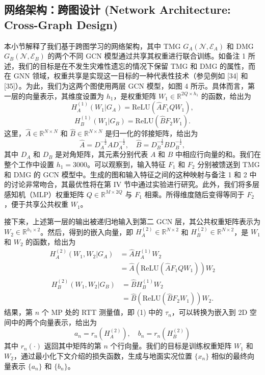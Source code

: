 \documentclass[journal]{IEEEtran}
\begin{document}
\subsection{网络架构：跨图设计 (Network Architecture: Cross-Graph Design)}
本小节解释了我们基于跨图学习的网络架构，其中 TMG $G_{A}(\mathcal{N},\mathcal{E}_{A})$ 和 DMG $G_{B}(\mathcal{N},\mathcal{E}_{B})$ 的两个不同 GCN 模型通过共享其权重进行联合训练。如备注 1 所述，我们的目标是在不发生灾难性遗忘的情况下保留 TMG 和 DMG 的属性，而在 GNN 领域，权重共享是实现这一目标的一种代表性技术（参见例如 [34] 和 [35]）。为此，我们为这两个图使用两层 GCN 模型，如图 4 所示。具体而言，第一层的向量表示，其维度设置为 $h_{1}$，是权重矩阵 $W_{1}\in\mathbb{R}^{2Q\times h_{1}}$ 的函数，给出为
\begin{equation}
H_{A}^{(1)}(W_{1}|G_{A})=\text{ReLU}(\hat{A}F_{1}QW_{1}), \label{eq:16}
\end{equation}
\begin{equation}
H_{B}^{(1)}(W_{1}|G_{B})=\text{ReLU}(\hat{B}F_{2}W_{1}). \label{eq:17}
\end{equation}
这里，$\hat{A}\in\mathbb{R}^{N\times N}$ 和 $\hat{B}\in\mathbb{R}^{N\times N}$ 是归一化的邻接矩阵，给出为
\begin{equation}
\hat{A}=D_{A}^{-\frac{1}{2}}AD_{A}^{-\frac{1}{2}}, \quad \hat{B}=D_{B}^{-\frac{1}{2}}BD_{B}^{-\frac{1}{2}}, \label{eq:18}
\end{equation}
其中 $D_{A}$ 和 $D_{B}$ 是对角矩阵，其元素分别代表 $A$ 和 $B$ 中相应行向量的和。我们在整个工作中设置 $h_{1}=3000$。可以观察到，输入特征 $F_{1}$ 和 $F_{2}$ 分别被馈送到 TMG 和 DMG 的 GCN 模型中。生成的图和输入特征之间的这种映射与备注 1 和 2 中的讨论非常吻合，其最优性将在第 IV 节中通过实验进行研究。此外，我们将多层感知机（MLP）权重矩阵 $Q\in\mathbb{R}^{M\times2Q}$ 与 $F_{1}$ 相乘。所得维度随后变得等同于 $F_{2}$，便于共享公共权重 $W_{1}$。

接下来，上述第一层的输出被递归地输入到第二 GCN 层，其公共权重矩阵表示为 $W_{2}\in\mathbb{R}^{h_{1}\times2}$。然后，得到的嵌入向量，即 $H_{A}^{(2)}\in\mathbb{R}^{N\times2}$ 和 $H_{B}^{(2)}\in\mathbb{R}^{N\times2}$，是 $W_{1}$ 和 $W_{2}$ 的函数，给出为
\begin{align}
H_{A}^{(2)}(W_{1},W_{2}|G_{A}) &= \hat{A}H_{A}^{(1)}W_{2} \nonumber \\
&= \hat{A}(\text{ReLU}(\hat{A}F_{1}QW_{1}))W_{2} \label{eq:19}
\end{align}
\begin{align}
H_{B}^{(2)}(W_{1},W_{2}|G_{B}) &= \hat{B}H_{B}^{(1)}W_{2} \nonumber \\
&= \hat{B}(\text{ReLU}(\hat{B}F_{2}W_{1}))W_{2}. \label{eq:20}
\end{align}
结果，第 $n$ 个 MP 处的 RTT 测量值，即 (1) 中的 $\tau_{n}$，可以转换为嵌入到 2D 空间中的两个向量表示，给出为
\begin{equation}
a_{n}=r_{n}(H_{A}^{(2)}), \quad b_{n}=r_{n}(H_{B}^{(2)}) \label{eq:21}
\end{equation}
其中 $r_{n}(\cdot)$ 返回其中矩阵的第 $n$ 个行向量。我们的目标是训练权重矩阵 $W_{1}$ 和 $W_{2}$，通过最小化下文介绍的损失函数，生成与地面实况位置 $\{x_{n}\}$ 相似的最终向量表示 $\{a_{n}\}$ 和 $\{b_{n}\}$。
\end{document}
